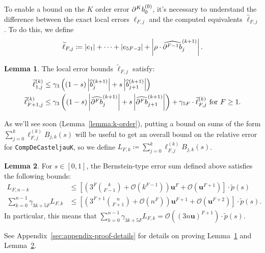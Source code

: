 \documentclass[3p, authoryear, square]{elsarticle}
\theoremstyle{definition}
\newtheorem{lemma}{Lemma}[section]
\newcommand{\bigO}[1]{\mathcal{O}\left(#1\right)}
\newcommand{\mach}{\mathbf{u}}
\newcommand{\db}[1]{
  \ifthenelse{\equal{#1}{1}}
             {\partial b}
             {\partial^{#1} b}
}
\newcommand{\cdb}[1]{
  \ifthenelse{\equal{#1}{1}}
             {\widehat{\partial b}}
             {\widehat{\partial^{#1} b}}
}
\begin{document}
To enable a bound on the \(K\) order error \(\db{K}^{(0)}_0\), it's necessary
to understand the difference between the exact local errors \(\ell_{F, j}\)
and the computed equivalents \(\widehat{\ell}_{F, j}\). To do this, we define
\begin{equation}
\widetilde{\ell}_{F, j} \coloneqq \left|e_1\right| +
\cdots + \left|e_{5F - 2}\right| + \left|\rho \cdot
\cdb{F - 1}_j^{(k + 1)}\right|.
\end{equation}

\begin{lemma}\label{lemma:ell-tilde}
The local error bounds \(\widetilde{\ell}_{F, j}\) satisfy:
\begin{align}
\widetilde{\ell}_{1, j}^{(k)} &\leq
  \gamma_3 \left(
  (1 - s) \left|\widehat{b}_j^{(k + 1)}\right| +
  s \left|\widehat{b}_{j + 1}^{(k + 1)}\right|\right)
  \label{ell-tilde-1} \\
\widetilde{\ell}_{F + 1, j}^{(k)} &\leq
  \gamma_3 \left(
  (1 - s) \left|\cdb{F}_j^{(k + 1)}\right| +
  s \left|\cdb{F}_{j + 1}^{(k + 1)}\right|\right) +
  \gamma_{5F} \cdot \widetilde{\ell}_{F, j}^{(k)}
  \text{ for } F \geq 1.
\end{align}
\end{lemma}

As we'll see soon (Lemma~\ref{lemma:k-order}), putting a bound on
sums of the form \(\sum_{j = 0}^k \ell_{F, j}^{(k)} B_{j, k}(s)\) will
be useful to get an overall bound on the relative error for
\texttt{CompDeCasteljauK}, so we define
\(L_{F, k} \coloneqq \sum_{j = 0}^k \ell_{F, j}^{(k)} B_{j, k}(s)\).

\begin{lemma}\label{lemma:L-and-D-bounds}
For \(s \in \left[0, 1\right]\), the Bernstein-type error sum defined above
satisfies the following bounds:
\begin{align}
L_{F, n - k} &\leq \left[\left(3^F \binom{k}{F - 1} + \bigO{k^{F - 1}}\right)
  \mach^F + \bigO{\mach^{F + 1}}\right] \cdot \widetilde{p}(s) \\
\sum_{k = 0}^{n - 1} \gamma_{3k + 5F} L_{F, k} &\leq
  \left[\left(3^{F + 1} \binom{n}{F + 1} + \bigO{n^F}\right)
  \mach^{F + 1} + \bigO{\mach^{F + 2}}\right] \cdot \widetilde{p}(s).
  \label{L-sum-bound}
\end{align}
In particular, this means that
\(\sum_{k = 0}^{n - 1} \gamma_{3k + 5F} L_{F, k} =
\bigO{(3 n \mach)^{F + 1}} \cdot \widetilde{p}(s)\).
\end{lemma}

See Appendix~\ref{sec:appendix-proof-details} for details on
proving Lemma~\ref{lemma:ell-tilde} and Lemma~\ref{lemma:L-and-D-bounds}.
\end{document}
